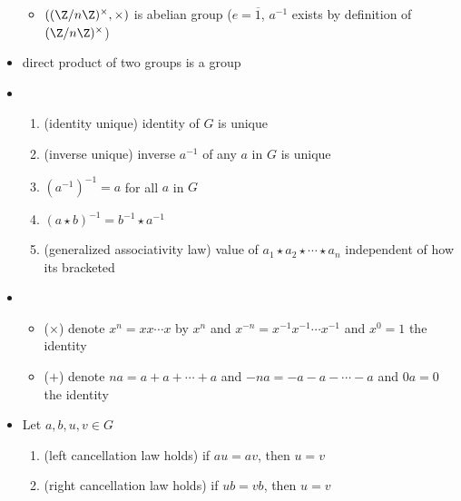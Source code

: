 \documentclass[11pt]{article}
\begin{document}
\begin{definition*}
\begin{itemize}
\begin{itemize}
            \item $(\integermodnmul, \times)$ is abelian group ($e = \overline{1}$, $a^{-1}$ exists by definition of $\integermodnmul$)
        \end{itemize}
        \item {} direct product of two groups is a group
        \item {}
        \begin{enumerate}
            \item (identity unique) identity of $G$ is unique
            \item (inverse unique) inverse $a^{-1}$ of any $a$ in $G$ is unique
            \item $(a^{-1})^{-1} = a$ for all $a$ in $G$
            \item $(a\star b)^{-1} = b^{-1} \star a^{-1}$
            \item (generalized associativity law) value of $a_1 \star a_2\star \cdots \star a_n$ independent of how its bracketed
        \end{enumerate}
        \item {}
        \begin{itemize}
            \item ($\times$) denote $x^n = xx \cdots x$ by $x^n$ and $x^{-n} = x^{-1}x^{-1} \cdots x^{-1}$ and $x^0 = 1$ the identity
            \item ($+$) denote $na = a+a+ \cdots + a$ and $-na = -a-a-\cdots -a$ and $0a = 0$ the identity 
        \end{itemize}
        \item {} Let $a,b,u,v\in G$
        \begin{enumerate}
            \item (left cancellation law holds) if $au = av$, then $u=v$ 
            \item (right cancellation law holds) if $ub = vb$, then $u=v$
        \end{enumerate}
    \end{itemize}
\end{definition*}
\end{document}
